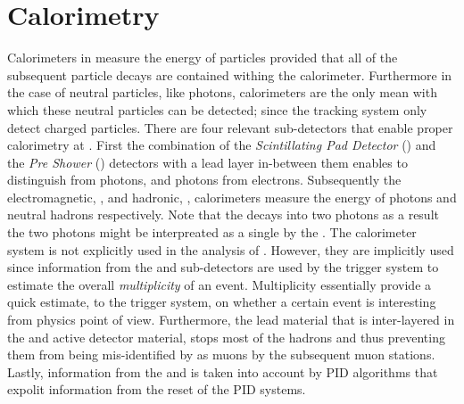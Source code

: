 

\section{Calorimetry}
\label{det_calo}
Calorimeters in \lhcb measure the energy of particles provided that all of the subsequent particle decays are
contained withing the calorimeter. Furthermore in the case of neutral particles, like photons,
calorimeters are the only mean with which these neutral particles can be detected; since the tracking system
only detect charged particles. There are four relevant sub-detectors
that enable proper calorimetry at \lhcb. First the combination of the {\it Scintillating Pad Detector} (\spd)
and the {\it Pre Shower} (\presh) detectors with a lead layer in-between them enables to distinguish \piz from
photons, and photons from electrons. Subsequently the electromagnetic, \ecal, and hadronic,
\hcal, calorimeters measure the energy of photons and neutral hadrons respectively.
Note that the \piz decays into two photons as a result the two photons might be interpreated as a single by the \ecal.
The calorimeter system is not explicitly used in the analysis of .
However, they are implicitly used since information from the \spd and \presh sub-detectors are used
by the \lzero trigger system to estimate the overall {\it multiplicity} of an event. Multiplicity essentially
provide a quick estimate, to the \lzero trigger system, on whether a certain event is interesting from physics
point of view. Furthermore, the lead material that is inter-layered in the \ecal and \hcal active detector material,
stops most of the hadrons and thus preventing them from being mis-identified by as muons by the subsequent muon stations.
Lastly, information from the \ecal and \hcal is taken into account by PID algorithms that expolit information from
the reset of the PID systems.


